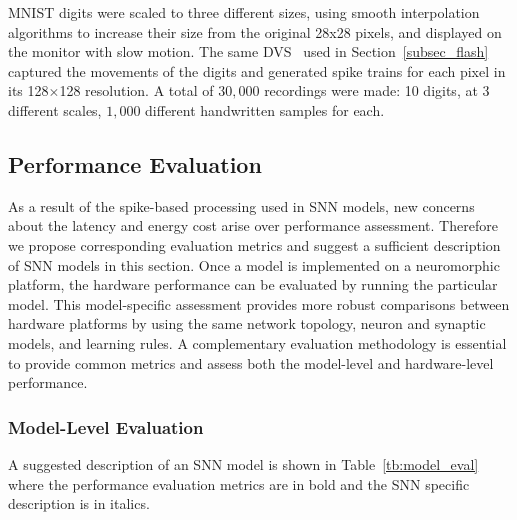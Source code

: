 MNIST digits were scaled to three different sizes, using smooth interpolation algorithms to increase their size from the original 28x28 pixels, and displayed on the monitor with slow motion. 
The same DVS~\cite{serrano2013128} used in Section~\ref{subsec_flash} captured the movements of the digits and generated spike trains for each pixel in its 128$\times$128 resolution.
A total of $30,000$ recordings were made: 10 digits, at 3 different scales, $1,000$ different handwritten samples for each.

\subsection{Performance Evaluation}
\label{sec:eval}
As a result of the spike-based processing used in SNN models, new concerns about the latency and energy cost arise over performance assessment.
Therefore we propose corresponding evaluation metrics and suggest a sufficient description of SNN models in this section.
Once a model is implemented on a neuromorphic platform, the hardware performance can be evaluated by running the particular model.
This model-specific assessment provides more robust comparisons between hardware platforms by using the same network topology, neuron and synaptic models, and learning rules. 
A complementary evaluation methodology is essential to provide common metrics and assess both the model-level and hardware-level performance.


\subsubsection{Model-Level Evaluation}
\label{subsec:model}

A suggested description of an SNN model is shown in Table~\ref{tb:model_eval} where the performance evaluation metrics are in bold and the SNN specific description is in italics.

